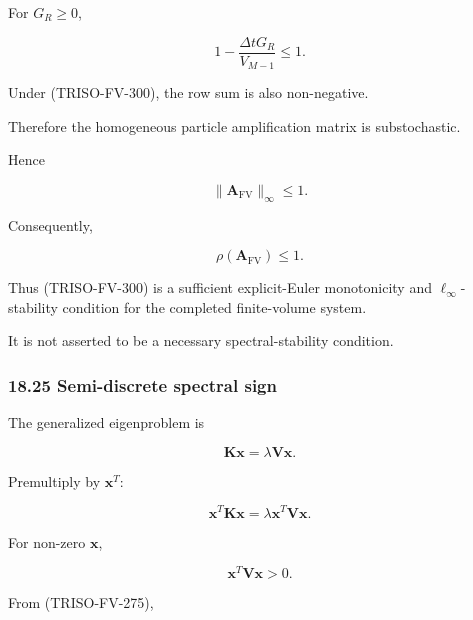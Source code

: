 \documentclass[11pt,a4paper]{article}
\begin{document}
For $G_R\ge0$,

\begin{equation}
1-
\frac{\Delta tG_R}{V_{M-1}}
\le1.
\tag{TRISO-FV-304}
\label{eq:triso-fv-304}
\end{equation}

Under (TRISO-FV-300), the row sum is also non-negative.

Therefore the homogeneous particle amplification matrix is substochastic.

Hence

\begin{equation}
\boxed{
\|\mathbf A_{\mathrm{FV}}\|_\infty\le1.
}
\tag{TRISO-FV-305}
\label{eq:triso-fv-305}
\end{equation}

Consequently,

\begin{equation}
\boxed{
\rho(\mathbf A_{\mathrm{FV}})\le1.
}
\tag{TRISO-FV-306}
\label{eq:triso-fv-306}
\end{equation}

Thus (TRISO-FV-300) is a sufficient explicit-Euler monotonicity and $\ell_\infty$-stability condition for the completed finite-volume system.

It is not asserted to be a necessary spectral-stability condition.

\subsubsection*{18.25 Semi-discrete spectral sign}

The generalized eigenproblem is

\begin{equation}
\mathbf K\mathbf x
=
\lambda
\mathbf V\mathbf x.
\tag{TRISO-FV-307}
\label{eq:triso-fv-307}
\end{equation}

Premultiply by $\mathbf x^T$:

\begin{equation}
\mathbf x^T\mathbf K\mathbf x
=
\lambda
\mathbf x^T\mathbf V\mathbf x.
\tag{TRISO-FV-308}
\label{eq:triso-fv-308}
\end{equation}

For non-zero $\mathbf x$,

\begin{equation}
\mathbf x^T\mathbf V\mathbf x>0.
\tag{TRISO-FV-309}
\label{eq:triso-fv-309}
\end{equation}

From (TRISO-FV-275),
\end{document}

